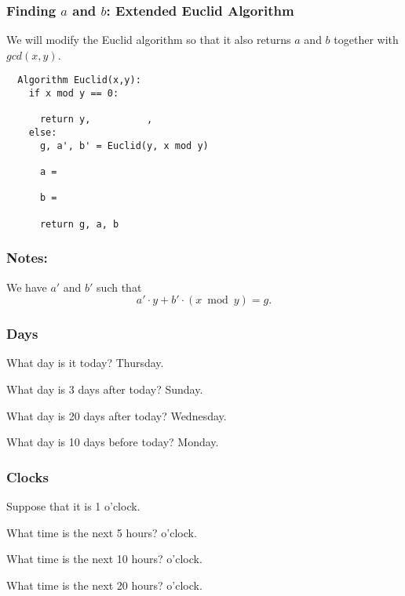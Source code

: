 \begin{frame}[fragile]
  \frametitle{Finding $a$ and $b$: Extended Euclid Algorithm}

  We will modify the Euclid algorithm so that it also returns $a$ and
  $b$ together with $gcd(x,y)$.
  
  \begin{tcolorbox}
  {\small
\begin{verbatim}
  Algorithm Euclid(x,y):
    if x mod y == 0:

      return y,          ,
    else:
      g, a', b' = Euclid(y, x mod y)

      a =

      b =

      return g, a, b
\end{verbatim}
  }
  \end{tcolorbox}
  
\end{frame}

\begin{frame}
  \frametitle{Notes:}

  We have $a'$ and $b'$ such that
  \[
  a'\cdot y + b'\cdot(x \bmod y) = g.
  \]

  \vspace{3in}
\end{frame}


\begin{frame}
  \frametitle{Days}

  What day is it today? \pause Thursday.

  \pause
  What day is 3 days after today? \pause Sunday.
  
  \pause
  What day is 20 days after today? \pause Wednesday.

  \pause
  What day is 10 days before today? \pause Monday.
\end{frame}

\begin{frame}
  \frametitle{Clocks}

  Suppose that it is 1 o'clock.

  \pause
  What time is the next 5 hours?   o'clock.
  
  \pause
  What time is the next 10 hours?   o'clock.
  
  \pause
  What time is the next 20 hours?   o'clock.
  
\end{frame}

